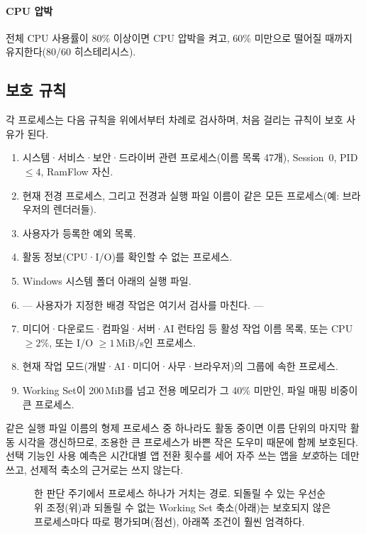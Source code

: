 \documentclass[11pt]{article}
\begin{document}
\paragraph{CPU 압박}
전체 CPU 사용률이 80\% 이상이면 CPU 압박을 켜고, 60\% 미만으로 떨어질 때까지 유지한다(80/60 히스테리시스).

\subsection{보호 규칙}
\label{sec:protect}
각 프로세스는 다음 규칙을 위에서부터 차례로 검사하며, 처음 걸리는 규칙이 보호 사유가 된다.
\begin{enumerate}[label=P\arabic*.,leftmargin=2.4em]
  \item 시스템·서비스·보안·드라이버 관련 프로세스(이름 목록 47개), Session~0, PID $\le4$, RamFlow 자신.
  \item 현재 전경 프로세스, 그리고 전경과 실행 파일 이름이 같은 모든 프로세스(예: 브라우저의 렌더러들).
  \item 사용자가 등록한 예외 목록.
  \item 활동 정보(CPU·I/O)를 확인할 수 없는 프로세스.
  \item Windows 시스템 폴더 아래의 실행 파일.
  \item[] {\color{ink2}\small --- 사용자가 지정한 배경 작업은 여기서 검사를 마친다. ---}
  \item 미디어·다운로드·컴파일·서버·AI 런타임 등 활성 작업 이름 목록, 또는 CPU $\ge 2\%$, 또는 I/O $\ge1$\,MiB/s인 프로세스.
  \item 현재 작업 모드(개발·AI·미디어·사무·브라우저)의 그룹에 속한 프로세스.
  \item Working Set이 200\,MiB를 넘고 전용 메모리가 그 40\% 미만인, 파일 매핑 비중이 큰 프로세스.
\end{enumerate}
\noindent 같은 실행 파일 이름의 형제 프로세스 중 하나라도 활동 중이면 이름 단위의 마지막 활동 시각을 갱신하므로, 조용한 큰 프로세스가 바쁜 작은 도우미 때문에 함께 보호된다. 선택 기능인 사용 예측은 시간대별 앱 전환 횟수를 세어 자주 쓰는 앱을 \emph{보호}하는 데만 쓰고, 선제적 축소의 근거로는 쓰지 않는다.

\begin{figure}[t]
  \centering
  
  \caption{한 판단 주기에서 프로세스 하나가 거치는 경로. 되돌릴 수 있는 우선순위 조정(위)과 되돌릴 수 없는 Working Set 축소(아래)는 보호되지 않은 프로세스마다 따로 평가되며(점선), 아래쪽 조건이 훨씬 엄격하다.}
  \label{fig:decision}
\end{figure}
\end{document}
